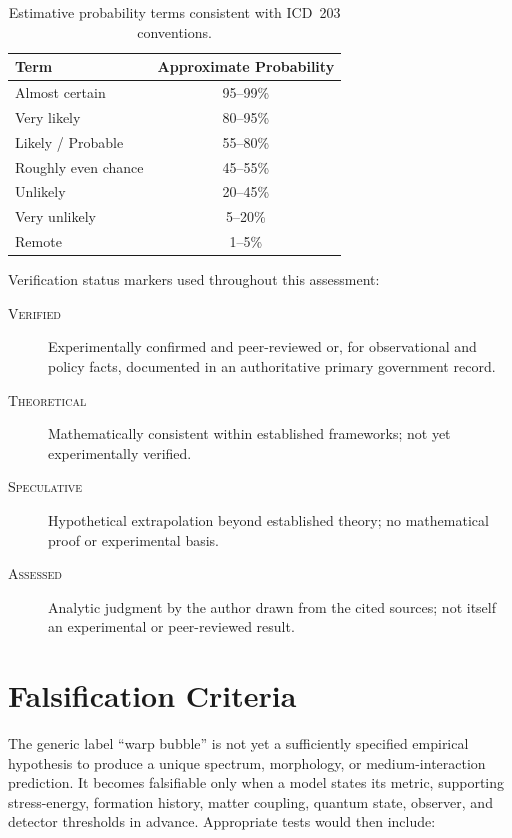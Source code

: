 \documentclass[aps,prd,twocolumn,superscriptaddress,nofootinbib,floatfix]{revtex4-2}
\begin{document}
\begin{table}[tb]
\caption{Estimative probability terms consistent with ICD~203 conventions.}
\label{tab:estimative}
\begin{tabular}{lc}
\toprule
Term & Approximate Probability \\
\midrule
Almost certain & 95--99\% \\
Very likely & 80--95\% \\
Likely / Probable & 55--80\% \\
Roughly even chance & 45--55\% \\
Unlikely & 20--45\% \\
Very unlikely & 5--20\% \\
Remote & 1--5\% \\
\bottomrule
\end{tabular}
\end{table}

Verification status markers used throughout this assessment:
\begin{description}
  \item[\normalfont\textsc{Verified}] Experimentally confirmed and peer-reviewed
    or, for observational and policy facts, documented in an authoritative
    primary government record.
  \item[\normalfont\textsc{Theoretical}] Mathematically consistent within established
    frameworks; not yet experimentally verified.
  \item[\normalfont\textsc{Speculative}] Hypothetical extrapolation beyond established
    theory; no mathematical proof or experimental basis.
  \item[\normalfont\textsc{Assessed}] Analytic judgment by the author drawn from
    the cited sources; not itself an experimental or peer-reviewed result.
\end{description}

\section{Falsification Criteria}\label{app:falsification}

The generic label ``warp bubble'' is not yet a sufficiently specified empirical
hypothesis to produce a unique spectrum, morphology, or medium-interaction
prediction. It becomes falsifiable only when a model states its metric, supporting
stress-energy, formation history, matter coupling, quantum state, observer, and
detector thresholds in advance. Appropriate tests would then include:
\end{document}
